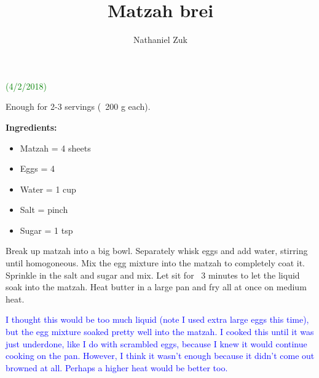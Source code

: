 \documentclass[11pt]{article}
\title{Matzah brei}
\author{Nathaniel Zuk}
\begin{document}
\maketitle

\textcolor{green}{(4/2/2018)}

Enough for 2-3 servings (~200 g each).

\textbf{Ingredients:}

\begin{itemize}
\item Matzah = 4 sheets
\item Eggs = 4
\item Water = 1 cup
\item Salt = pinch
\item Sugar = 1 tsp
\end{itemize}

Break up matzah into a big bowl.  Separately whisk eggs and add water, stirring until homogoneous.  Mix the egg mixture into the matzah to completely coat it.  Sprinkle in the salt and sugar and mix.  Let sit for ~3 minutes to let the liquid soak into the matzah.  Heat butter in a large pan and fry all at once on medium heat.

\textcolor{blue}{I thought this would be too much liquid (note I used extra large eggs this time), but the egg mixture soaked pretty well into the matzah.  I cooked this until it was just underdone, like I do with scrambled eggs, because I knew it would continue cooking on the pan.  However, I think it wasn't enough because it didn't come out browned at all.  Perhaps a higher heat would be better too.}
\end{document}
